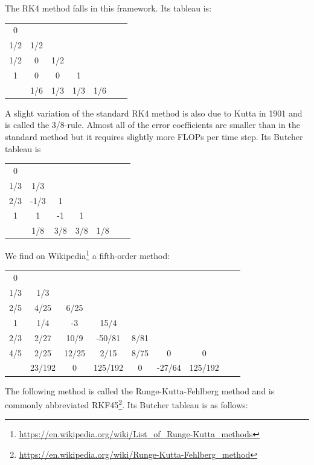 The RK4 method falls in this framework. Its tableau is:

\begin{mdframed}[backgroundcolor=blue!5]
\begin{tabular}{c|cccccc}
0 & \\
1/2 & 1/2 \\
1/2 & 0 & 1/2 \\
1 & 0 & 0 & 1 \\
\hline
 & 1/6 & 1/3 & 1/3 & 1/6 
\end{tabular}
\end{mdframed}

A slight variation of the standard RK4 method is also due to Kutta in 1901 and is called the 3/8-rule. 
Almost all of the error coefficients are smaller than in the standard method but it requires 
slightly more FLOPs per time step. Its Butcher tableau is

\begin{mdframed}[backgroundcolor=blue!5]
\begin{tabular}{c|cccccc}
0 & \\
1/3 & 1/3 \\
2/3 & -1/3 & 1 \\
1 & 1 & -1 & 1 \\
\hline
 & 1/8 & 3/8 & 3/8 & 1/8 
\end{tabular}
\end{mdframed}

We find on Wikipedia\footnote{\url{https://en.wikipedia.org/wiki/List_of_Runge-Kutta_methods}}
a fifth-order method:

\begin{mdframed}[backgroundcolor=blue!5]
\begin{tabular}{c|cccccccc}
0 & \\
1/3 & 1/3 \\
2/5 & 4/25 & 6/25 \\
1 & 1/4 & -3 & 15/4 \\
2/3 & 2/27 & 10/9 & -50/81 & 8/81 \\
4/5 & 2/25 & 12/25 & 2/15 & 8/75 & 0 & 0 \\ 
\hline
 & 23/192 & 0 & 125/192 & 0 & -27/64 & 125/192 \\
\end{tabular}
\end{mdframed}





 
The following method is called the Runge-Kutta-Fehlberg method and is 
commonly abbreviated 
RKF45\footnote{\url{https://en.wikipedia.org/wiki/Runge-Kutta-Fehlberg_method}}. 
Its Butcher tableau is as follows: 

